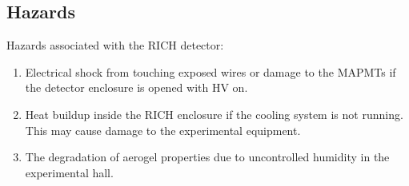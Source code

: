 \subsection{Hazards} 

Hazards associated with the RICH detector:
\begin{enumerate}
\item  Electrical shock from touching exposed wires or damage to the MAPMTs if the detector enclosure 
is opened with HV on.
\item Heat buildup inside the RICH enclosure if the cooling system is not running. This may cause 
damage to the experimental equipment.
\item The degradation of aerogel properties due to uncontrolled humidity in the experimental hall.
\end{enumerate}

